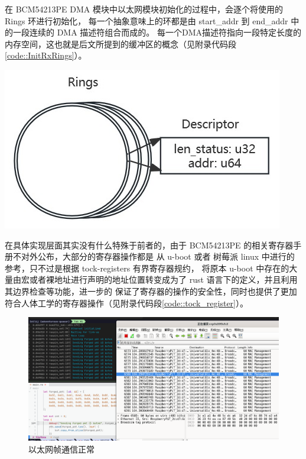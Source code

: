     \begin{adjustwidth}{0cm}{} %
    \begin{minipage}[b]{0.5\linewidth}
        \setlength{\parindent}{2em} %
        在 BCM54213PE DMA 模块中以太网模块初始化的过程中，会逐个将使用的 Rings 环进行初始化，
        每一个抽象意味上的环都是由 start\_addr 到 end\_addr 中的一段连续的 DMA 描述符组合而成的。
        每一个DMA描述符指向一段特定长度的内存空间，这也就是后文所提到的缓冲区的概念（见附录代码段\ref{code::InitRxRings}）。

    \end{minipage}
    \hfill
    \begin{minipage}[b]{0.45\linewidth}
        \includegraphics[scale=0.6]{./imgs/Rings_and_Descs.jpg}        
         \label{pict:DmaDescAndLoop}
    \end{minipage}
    \end{adjustwidth}
    
    在具体实现层面其实没有什么特殊于前者的，由于 BCM54213PE 的相关寄存器手册不对外公布，大部分的寄存器操作都是
    从 u-boot 或者 树莓派 linux 中进行的参考，只不过是根据 tock-registers 有界寄存器规约，
    将原本 u-boot 中存在的大量由宏或者裸地址进行声明的地址位置转变成为了 rust 语言下的定义，并且利用其边界检查等功能，进一步的
    保证了寄存器的操作的安全性，同时也提供了更加符合人体工学的寄存器操作（见附录代码段\ref{code::tock_register}）。

    \begin{figure}[ht]
        \centering
        \includegraphics[scale=0.3]{./imgs/以太网帧通信正常.jpg}
        \caption{以太网帧通信正常}    \label{fig::树莓派通信正常}
    \end{figure}

